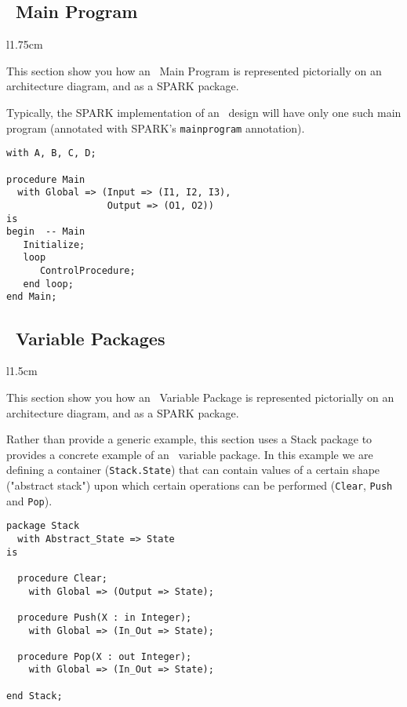 \subsection{\informed\ Main Program}

\begin{wrapfigure}{l}{1.75cm}
\end{wrapfigure}
This section show you how an \informed\ Main Program is represented
pictorially on an architecture diagram, and as a SPARK package.

Typically, the SPARK implementation of an \informed\ design will have
only one such main program (annotated with SPARK's
\texttt{main\textunderscore program} annotation).

\begin{lstlisting}[caption=An \informed\ SPARK Main program]
with A, B, C, D;

procedure Main
  with Global => (Input => (I1, I2, I3),
                  Output => (O1, O2))
is
begin  -- Main
   Initialize;
   loop
      ControlProcedure;
   end loop;
end Main;
\end{lstlisting}


\subsection{\informed\ Variable Packages}

\begin{wrapfigure}{l}{1.5cm}
\end{wrapfigure}

This section show you how an \informed\ Variable Package is
represented pictorially on an architecture diagram, and as a SPARK
package.

Rather than provide a generic example, this section uses a Stack
package to provides a concrete example of an \informed\ variable
package. In this example we are defining a container
(\texttt{Stack.State}) that can contain values of a certain shape
("abstract stack") upon which certain operations can be performed
(\texttt{Clear}, \texttt{Push} and \texttt{Pop}).


\begin{lstlisting}[caption=An \informed\ SPARK variable package]
package Stack
  with Abstract_State => State
is

  procedure Clear;
    with Global => (Output => State);

  procedure Push(X : in Integer);
    with Global => (In_Out => State);

  procedure Pop(X : out Integer);
    with Global => (In_Out => State);

end Stack;
\end{lstlisting}

